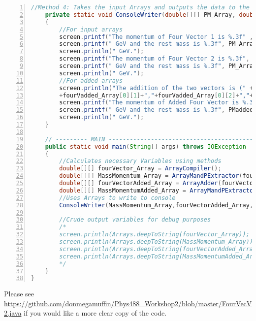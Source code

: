 \documentclass{article}
\begin{document}
\begin{lstlisting}[language=java, numbers=left, tabsize=1, showspaces=false, showstringspaces=false]
	//Method 4: Takes the input Arrays and outputs the data to the console as strings
	private static void ConsoleWriter(double[][] PM_Array, double[][] fourVadded_Array, double[][] PMadded_Array)
	{
		//For input arrays
		screen.printf("The momentum of Four Vector 1 is %.3f" , PM_Array[0][0]);
		screen.printf(" GeV and the rest mass is %.3f", PM_Array[0][1]);
		screen.println(" GeV.");
		screen.printf("The momentum of Four Vector 2 is %.3f", PM_Array[1][0]); 
		screen.printf(" GeV and the rest mass is %.3f", PM_Array[1][1]);
		screen.println(" GeV.");
		//For added arrays
		screen.println("The addition of the two vectors is (" +fourVadded_Array[0][0]+ ","
		+fourVadded_Array[0][1]+","+fourVadded_Array[0][2]+","+fourVadded_Array[0][3]+").");
		screen.printf("The momentum of Added Four Vector is %.3f", PMadded_Array[0][0]); 
		screen.printf(" GeV and the rest mass is %.3f", PMadded_Array[0][1]);
		screen.println(" GeV.");
	}
	
	// --------- MAIN ----------------------------------------------------------------------------------------------
	public static void main(String[] args) throws IOException
	{
		//Calculates necessary Variables using methods
		double[][] fourVector_Array = ArrayCompiler();
		double[][] MassMomentum_Array = ArrayMandPExtractor(fourVector_Array);
		double[][] fourVectorAdded_Array = ArrayAdder(fourVector_Array);
		double[][] MassMomentumAdded_Array = ArrayMandPExtractor(fourVectorAdded_Array);
		//Uses Arrays to write to console
		ConsoleWriter(MassMomentum_Array,fourVectorAdded_Array,MassMomentumAdded_Array);
		
		//Crude output variables for debug purposes
		/*
		screen.println(Arrays.deepToString(fourVector_Array));
		screen.println(Arrays.deepToString(MassMomentum_Array));
		screen.println(Arrays.deepToString(fourVectorAdded_Array));
		screen.println(Arrays.deepToString(MassMomentumAdded_Array));
		*/
	}
}
\end{lstlisting}
Please see \url{https://github.com/donmegamuffin/Phys488_Workshop2/blob/master/FourVecV2.java} if you would like a more clear copy of the code.
\end{document}
